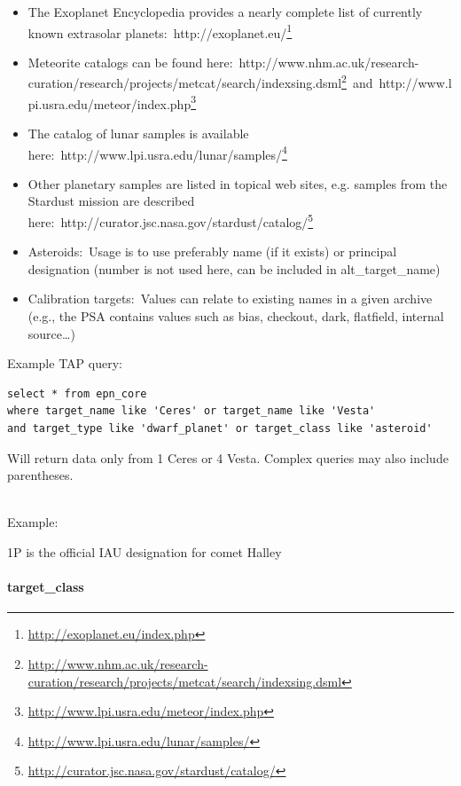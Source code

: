 \documentclass[11pt,a4paper]{ivoa}
\begin{document}
\begin{itemize}
\item The Exoplanet Encyclopedia provides a nearly complete list of currently known extrasolar planets: http://exoplanet.eu/\footnote{\url{http://exoplanet.eu/index.php}}
\item Meteorite catalogs can be found here: http://www.nhm.ac.uk/research-curation/research/projects/metcat/search/indexsing.dsml\footnote{\url{http://www.nhm.ac.uk/research-curation/research/projects/metcat/search/indexsing.dsml}} and http://www.lpi.usra.edu/meteor/index.php\footnote{\url{http://www.lpi.usra.edu/meteor/index.php}}
\item The catalog of lunar samples is available here: http://www.lpi.usra.edu/lunar/samples/\footnote{\url{http://www.lpi.usra.edu/lunar/samples/}}
\item Other planetary samples are listed in topical web sites, e.g. samples from the Stardust mission are described here: http://curator.jsc.nasa.gov/stardust/catalog/\footnote{\url{http://curator.jsc.nasa.gov/stardust/catalog/}}
\item Asteroids: Usage is to use preferably name (if it exists) or principal designation (number is not used here, can be included in alt\_target\_name)
\item Calibration targets: Values can relate to existing names in a given archive (e.g., the PSA contains values such as bias, checkout, dark, flatfield, internal source…)
\end{itemize}

Example TAP query:






\begin{verbatim}
select * from epn_core 
where target_name like 'Ceres' or target_name like 'Vesta' 
and target_type like 'dwarf_planet' or target_class like 'asteroid'
\end{verbatim}




Will return data only from 1 Ceres or 4 Vesta. Complex queries may also include parentheses.

\\

Example:

1P is the official IAU designation for comet Halley

\paragraph{target\_class}
\end{document}
